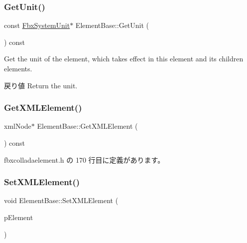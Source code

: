 \subsubsection{\texorpdfstring{Get\+Unit()}{GetUnit()}}
{\footnotesize\ttfamily const \hyperlink{class_fbx_system_unit}{Fbx\+System\+Unit}$\ast$ Element\+Base\+::\+Get\+Unit (\begin{DoxyParamCaption}{ }\end{DoxyParamCaption}) const}

Get the unit of the element, which takes effect in this element and its children elements. \begin{DoxyReturn}{戻り値}
Return the unit. 
\end{DoxyReturn}
\mbox{\label{class_element_base_adb072862588f793bb86e70f43df92b27}} 
\subsubsection{\texorpdfstring{Get\+X\+M\+L\+Element()}{GetXMLElement()}}
{\footnotesize\ttfamily xml\+Node$\ast$ Element\+Base\+::\+Get\+X\+M\+L\+Element (\begin{DoxyParamCaption}{ }\end{DoxyParamCaption}) const\hspace{0.3cm}{\ttfamily [inline]}}



 fbxcolladaelement.\+h の 170 行目に定義があります。

\mbox{\label{class_element_base_a7d2be8b683fab79fab4c45aaf484f18c}} 
\subsubsection{\texorpdfstring{Set\+X\+M\+L\+Element()}{SetXMLElement()}}
{\footnotesize\ttfamily void Element\+Base\+::\+Set\+X\+M\+L\+Element (\begin{DoxyParamCaption}\item[{xml\+Node $\ast$}]{p\+Element }\end{DoxyParamCaption})\hspace{0.3cm}{\ttfamily [inline]}}

